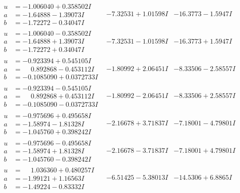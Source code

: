\documentclass[1p]{elsarticle_modified}
\theoremstyle{definition}
\begin{document}
$$\begin{array}{c|c|c}
\begin{aligned}
u &= -1.006040 + 0.358502 I \\
a &= -1.64888 - 1.39073 I \\
b &= -1.72272 - 0.34047 I\end{aligned}
 & -7.32531 + 1.01598 I & -16.3773 - 1.5947 I \\ \hline\begin{aligned}
u &= -1.006040 - 0.358502 I \\
a &= -1.64888 + 1.39073 I \\
b &= -1.72272 + 0.34047 I\end{aligned}
 & -7.32531 - 1.01598 I & -16.3773 + 1.5947 I \\ \hline\begin{aligned}
u &= -0.923394 + 0.545105 I \\
a &= \phantom{-}0.892868 - 0.453112 I \\
b &= -0.1085090 + 0.0372733 I\end{aligned}
 & -1.80992 + 2.06451 I & -8.33506 - 2.58557 I \\ \hline\begin{aligned}
u &= -0.923394 - 0.545105 I \\
a &= \phantom{-}0.892868 + 0.453112 I \\
b &= -0.1085090 - 0.0372733 I\end{aligned}
 & -1.80992 - 2.06451 I & -8.33506 + 2.58557 I \\ \hline\begin{aligned}
u &= -0.975696 + 0.495658 I \\
a &= -1.58974 - 1.81328 I \\
b &= -1.045760 + 0.398242 I\end{aligned}
 & -2.16678 + 3.71837 I & -7.18001 - 4.79801 I \\ \hline\begin{aligned}
u &= -0.975696 - 0.495658 I \\
a &= -1.58974 + 1.81328 I \\
b &= -1.045760 - 0.398242 I\end{aligned}
 & -2.16678 - 3.71837 I & -7.18001 + 4.79801 I \\ \hline\begin{aligned}
u &= \phantom{-}1.036360 + 0.480257 I \\
a &= -1.99121 + 1.16563 I \\
b &= -1.49224 - 0.83332 I\end{aligned}
 & -6.51425 - 5.38013 I & -14.5306 + 6.8865 I \\ \hline\begin{aligned}

\end{aligned}
\end{array}$$
\end{document}
